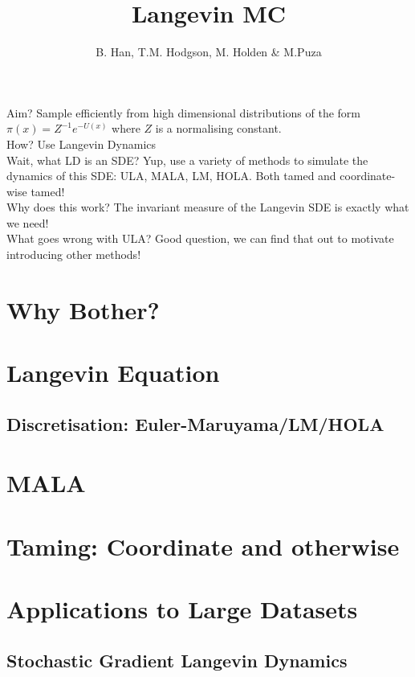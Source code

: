 \documentclass[a4paper]{article}
\title{Langevin MC}
\author{B. Han, T.M. Hodgson, M. Holden \& M.Puza}
\begin{document}
	\maketitle 
	Aim? Sample efficiently from high dimensional distributions of the form \(\pi(x) = Z^{-1} e^{-U(x)}\) where \(Z\) is a normalising constant.\\
	How? Use Langevin Dynamics\\
	Wait, what LD is an SDE? Yup, use a variety of methods to simulate the dynamics of this SDE: ULA, MALA, LM, HOLA. Both tamed and coordinate-wise tamed!\\
	Why does this work? The invariant measure of the Langevin SDE is exactly what we need!\\
	What goes wrong with ULA? Good question, we can find that out to motivate introducing other methods!\\
	\section{Why Bother?}
	\section{Langevin Equation}
		\subsection{Discretisation: Euler-Maruyama/LM/HOLA}
		
	\section{MALA}
	
	\section{Taming: Coordinate and otherwise}
	
	\section{Applications to Large Datasets}
		\subsection{Stochastic Gradient Langevin Dynamics}
\end{document}
